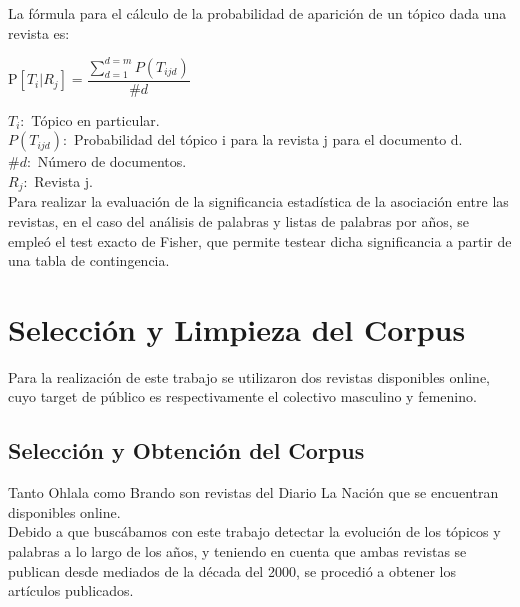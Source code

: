 \documentclass[a4paper]{article}
\begin{document}
La f\'ormula para el cálculo de la probabilidad de aparici\'on de un t\'opico dada una revista es:\\
\begin{center}
$\text{P}[T_i|R_j] = \dfrac{\sum_{d=1}^{d=m} P(T_{ijd})}{\#d}$
\end{center}
$T_i:$ T\'opico en particular.\\
$P(T_{ijd}):$ Probabilidad del t\'opico i para la revista j para el documento d.\\
$\#d:$ N\'umero de documentos.\\
$R_j:$ Revista j.\\


Para realizar la evaluación de la significancia estadística de la asociación entre las revistas, en el caso del an\'alisis de  palabras y listas de palabras por años, se empleó el test exacto de Fisher, que permite testear dicha significancia a partir de una tabla de contingencia.\\

\section{Selecci\'on y Limpieza del Corpus}

Para la realizaci\'on de este trabajo se utilizaron dos revistas disponibles online, cuyo target de p\'ublico es respectivamente el colectivo masculino y femenino.\\

\subsection{Selecci\'on y Obtenci\'on del Corpus}
Tanto Ohlala como Brando son revistas del Diario La Naci\'on que se encuentran disponibles online.\\
Debido a que busc\'abamos con este trabajo detectar la evoluci\'on de los t\'opicos y palabras a lo largo de los a\~nos, y teniendo en cuenta que ambas revistas se publican desde mediados de la d\'ecada del 2000, se procedi\'o a obtener los art\'iculos publicados.\\
\end{document}
